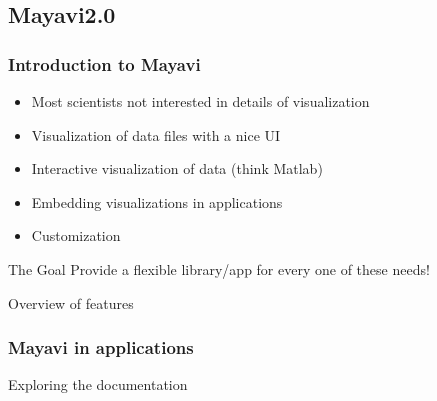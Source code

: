 \documentclass[compress,14pt]{beamer}
\begin{document}
\subsection{Mayavi2.0}

\begin{frame}
  \frametitle{Introduction to Mayavi}
  \begin{itemize}
  \item Most scientists not interested in details of visualization
  \item Visualization of data files with a nice UI
  \item Interactive visualization of data (think Matlab)
  \item Embedding visualizations in applications
  \item Customization
  \end{itemize}
  \pause
  \begin{block}{The Goal}
      Provide a \alert{flexible} library/app for every one of these needs!
  \end{block}
\end{frame}

\begin{frame}
    {Overview of features}
      \vspace*{-0.3in}
  \begin{center}    
    \hspace*{-0.2in}
  \end{center}    
\end{frame}


\begin{frame}
    \frametitle{Mayavi in applications}
      \vspace*{-0.3in}
  \begin{center}    
    \hspace*{-0.2in}
  \end{center}
\end{frame}

\begin{frame}
    {Exploring the documentation}
    \begin{center}
    \end{center}
\end{frame}
\end{document}
